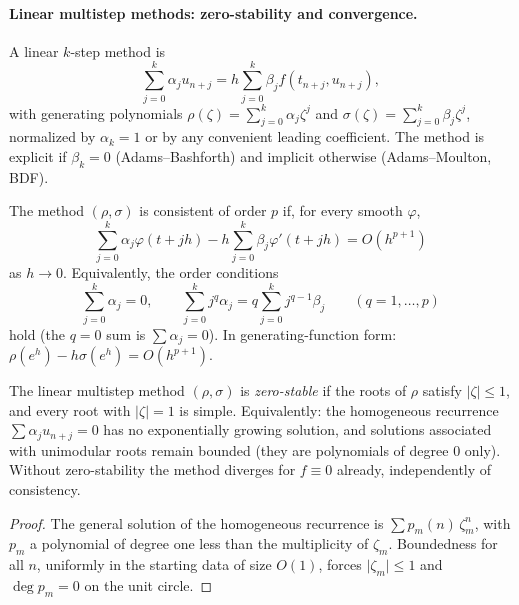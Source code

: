 \documentclass[11pt,a4paper]{article}
\begin{document}
\paragraph{Linear multistep methods: zero-stability and convergence.}

\begin{definition}
\label{def:lmm}
A linear \(k\)-step method is
\[
\sum_{j=0}^{k}\alpha_{j}u_{n+j}
=
h\sum_{j=0}^{k}\beta_{j}f(t_{n+j},u_{n+j}),
\]
with generating polynomials \(\rho(\zeta)=\sum_{j=0}^{k}\alpha_{j}\zeta^{j}\) and \(\sigma(\zeta)=\sum_{j=0}^{k}\beta_{j}\zeta^{j}\), normalized by \(\alpha_{k}=1\) or by any convenient leading coefficient. The method is explicit if \(\beta_{k}=0\) (Adams--Bashforth) and implicit otherwise (Adams--Moulton, BDF).
\end{definition}

\begin{definition}
\label{def:lmm-order}
The method \((\rho,\sigma)\) is consistent of order \(p\) if, for every smooth \(\varphi\),
\[
\sum_{j=0}^{k}\alpha_{j}\varphi(t+jh)-h\sum_{j=0}^{k}\beta_{j}\varphi'(t+jh)
=
O(h^{p+1})
\]
as \(h\to 0\). Equivalently, the order conditions
\[
\sum_{j=0}^{k}\alpha_{j}=0,
\qquad
\sum_{j=0}^{k}j^{q}\alpha_{j}
=
q\sum_{j=0}^{k}j^{q-1}\beta_{j}
\qquad (q=1,\ldots,p)
\]
hold (the \(q=0\) sum is \(\sum\alpha_{j}=0\)). In generating-function form: \(\rho(e^{h})-h\sigma(e^{h})=O(h^{p+1})\).
\end{definition}

\begin{theorem}
\label{thm:root-condition}
The linear multistep method \((\rho,\sigma)\) is \emph{zero-stable} if the roots of \(\rho\) satisfy \(\lvert\zeta\rvert\le 1\), and every root with \(\lvert\zeta\rvert=1\) is simple. Equivalently: the homogeneous recurrence \(\sum\alpha_{j}u_{n+j}=0\) has no exponentially growing solution, and solutions associated with unimodular roots remain bounded (they are polynomials of degree \(0\) only). Without zero-stability the method diverges for \(f\equiv 0\) already, independently of consistency.
\end{theorem}

\begin{proof}
The general solution of the homogeneous recurrence is \(\sum p_{m}(n)\,\zeta_{m}^{n}\), with \(p_{m}\) a polynomial of degree one less than the multiplicity of \(\zeta_{m}\). Boundedness for all \(n\), uniformly in the starting data of size \(O(1)\), forces \(\lvert\zeta_{m}\rvert\le 1\) and \(\deg p_{m}=0\) on the unit circle.
\end{proof}
\end{document}
